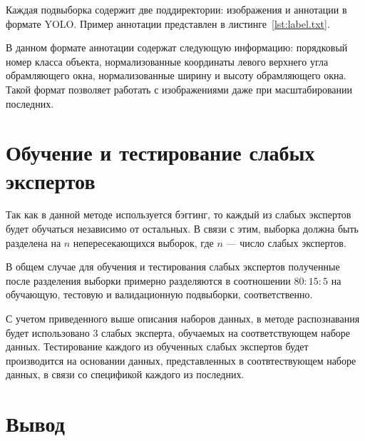 Каждая подвыборка содержит две поддиректории: изображения и аннотации в формате YOLO. Пример аннотации представлен в листинге~\ref{lst:label.txt}.


В данном формате аннотации содержат следующую информацию: порядковый номер класса объекта, нормализованные координаты левого верхнего угла обрамляющего окна, нормализованные ширину и высоту обрамляющего окна. Такой формат позволяет работать с изображениями даже при масштабировании последних.

\section{Обучение и тестирование слабых экспертов}

Так как в данной методе используется бэггинг, то каждый из слабых экспертов будет обучаться независимо от остальных. В связи с этим, выборка должна быть разделена на $n$ непересекающихся выборок, где $n$ --- число слабых экспертов.

В общем случае для обучения и тестирования слабых экспертов полученные после разделения выборки примерно разделяются в соотношении $80:15:5$ на обучающую, тестовую и валидационную подвыборки, соответственно.

С учетом приведенного выше описания наборов данных, в методе распознавания будет использовано 3 слабых эксперта, обучаемых на соответствующем наборе данных. Тестирование каждого из обученных слабых экспертов будет производится на основании данных, представленных в соотвтествующем наборе данных, в связи со спецификой каждого из последних.

\section{Вывод}